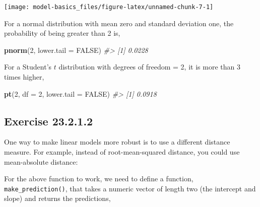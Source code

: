 \documentclass[]{book}
\newenvironment{Shaded}{\begin{snugshade}}{\end{snugshade}}
\newcommand{\CommentTok}[1]{\textcolor[rgb]{0.56,0.35,0.01}{\textit{#1}}}
\newcommand{\ControlFlowTok}[1]{\textcolor[rgb]{0.13,0.29,0.53}{\textbf{#1}}}
\newcommand{\DataTypeTok}[1]{\textcolor[rgb]{0.13,0.29,0.53}{#1}}
\newcommand{\DecValTok}[1]{\textcolor[rgb]{0.00,0.00,0.81}{#1}}
\newcommand{\KeywordTok}[1]{\textcolor[rgb]{0.13,0.29,0.53}{\textbf{#1}}}
\newcommand{\NormalTok}[1]{#1}
\newcommand{\OperatorTok}[1]{\textcolor[rgb]{0.81,0.36,0.00}{\textbf{#1}}}
\newcommand{\OtherTok}[1]{\textcolor[rgb]{0.56,0.35,0.01}{#1}}
\newcommand{\StringTok}[1]{\textcolor[rgb]{0.31,0.60,0.02}{#1}}
\theoremstyle{plain}
\theoremstyle{remark}
\begin{document}
\begin{center}\texttt{[image: model-basics\_files/figure-latex/unnamed-chunk-7-1]} \end{center}

For a normal distribution with mean zero and standard deviation one, the probability of being greater than 2 is,

\begin{Shaded}
\begin{Highlighting}[]
\KeywordTok{pnorm}\NormalTok{(}\DecValTok{2}\NormalTok{, }\DataTypeTok{lower.tail =} \OtherTok{FALSE}\NormalTok{)}
\CommentTok{#> [1] 0.0228}
\end{Highlighting}
\end{Shaded}

For a Student's \(t\) distribution with degrees of freedom = 2, it is more than 3 times higher,

\begin{Shaded}
\begin{Highlighting}[]
\KeywordTok{pt}\NormalTok{(}\DecValTok{2}\NormalTok{, }\DataTypeTok{df =} \DecValTok{2}\NormalTok{, }\DataTypeTok{lower.tail =} \OtherTok{FALSE}\NormalTok{)}
\CommentTok{#> [1] 0.0918}
\end{Highlighting}
\end{Shaded}

\hypertarget{exercise-23.2.1.2}{%
\subsection*{\texorpdfstring{Exercise {23.2.1.2}}{Exercise 23.2.1.2}}\label{exercise-23.2.1.2}}

One way to make linear models more robust is to use a different distance measure. For example, instead of root-mean-squared distance, you could use mean-absolute distance:

\begin{Shaded}
\end{Shaded}

For the above function to work, we need to define a function, \texttt{make\_prediction()}, that
takes a numeric vector of length two (the intercept and slope) and returns the predictions,
\end{document}
